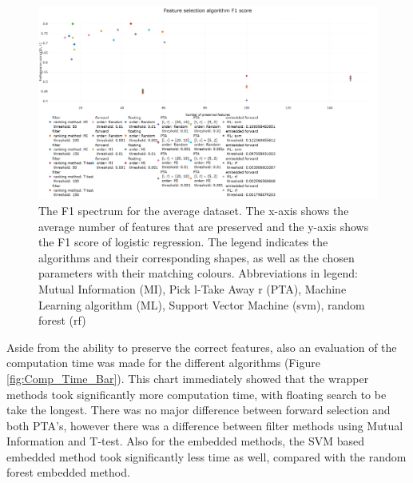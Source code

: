 \documentclass[10pt,a4paper]{article}
\begin{document}
\begin{figure}[H]
	\centering
	\includegraphics[angle=90,height=1.4\textwidth]{F1_new.png}
	\caption{The F1 spectrum for the average dataset. The x-axis shows the average number of features that are preserved and the y-axis shows the F1 score of logistic regression. The legend indicates the algorithms and their corresponding shapes, as well as the chosen parameters with their matching colours. Abbreviations in legend: Mutual Information (MI), Pick l-Take Away r (PTA), Machine Learning algorithm (ML), Support Vector Machine (svm), random forest (rf)}
	\label{fig:Avg_F1_Spectrum}
\end{figure}

	Aside from the ability to preserve the correct features, also an evaluation of the computation time was made for the different algorithms (Figure \ref{fig:Comp_Time_Bar}). This chart immediately showed that the wrapper methods took significantly more computation time, with floating search to be take the longest. There was no major difference between forward selection and both PTA's, however there was a difference between filter methods using Mutual Information and T-test. Also for the embedded methods, the SVM based embedded method took significantly less time as well, compared with the random forest embedded method.
\end{document}
